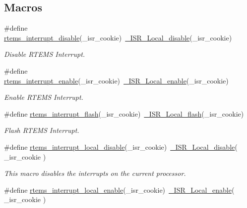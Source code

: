 \subsection*{Macros}
\begin{DoxyCompactItemize}
\item 
\#define \mbox{\hyperlink{group__ClassicINTR_gaf105388007be1416e810e1522cfe16e1}{rtems\+\_\+interrupt\+\_\+disable}}(\+\_\+isr\+\_\+cookie)~\mbox{\hyperlink{group__RTEMSScoreISR_ga2a829f51f98576aa596562985e1df2fc}{\+\_\+\+I\+S\+R\+\_\+\+Local\+\_\+disable}}(\+\_\+isr\+\_\+cookie)
\begin{DoxyCompactList}\small\item\em Disable R\+T\+E\+MS Interrupt. \end{DoxyCompactList}\item 
\#define \mbox{\hyperlink{group__ClassicINTR_gae4fb58b530af7eaba10c45b015282090}{rtems\+\_\+interrupt\+\_\+enable}}(\+\_\+isr\+\_\+cookie)~\mbox{\hyperlink{group__RTEMSScoreISR_ga508f5a32655cb590906a477b5a8174f1}{\+\_\+\+I\+S\+R\+\_\+\+Local\+\_\+enable}}(\+\_\+isr\+\_\+cookie)
\begin{DoxyCompactList}\small\item\em Enable R\+T\+E\+MS Interrupt. \end{DoxyCompactList}\item 
\#define \mbox{\hyperlink{group__ClassicINTR_ga994652cecbf5fc6e0bd8b9f5f2cb196d}{rtems\+\_\+interrupt\+\_\+flash}}(\+\_\+isr\+\_\+cookie)~\mbox{\hyperlink{group__RTEMSScoreISR_ga2ac9dcbae9ca059453a2042e5854f73f}{\+\_\+\+I\+S\+R\+\_\+\+Local\+\_\+flash}}(\+\_\+isr\+\_\+cookie)
\begin{DoxyCompactList}\small\item\em Flash R\+T\+E\+MS Interrupt. \end{DoxyCompactList}\item 
\#define \mbox{\hyperlink{group__ClassicINTR_ga691a9f609c9d6bf071d0966b8b715fab}{rtems\+\_\+interrupt\+\_\+local\+\_\+disable}}(\+\_\+isr\+\_\+cookie)~\mbox{\hyperlink{group__RTEMSScoreISR_ga2a829f51f98576aa596562985e1df2fc}{\+\_\+\+I\+S\+R\+\_\+\+Local\+\_\+disable}}( \+\_\+isr\+\_\+cookie )
\begin{DoxyCompactList}\small\item\em This macro disables the interrupts on the current processor. \end{DoxyCompactList}\item 
\#define \mbox{\hyperlink{group__ClassicINTR_gabd2556ab8902ebb660b470e144bdc55a}{rtems\+\_\+interrupt\+\_\+local\+\_\+enable}}(\+\_\+isr\+\_\+cookie)~\mbox{\hyperlink{group__RTEMSScoreISR_ga508f5a32655cb590906a477b5a8174f1}{\+\_\+\+I\+S\+R\+\_\+\+Local\+\_\+enable}}( \+\_\+isr\+\_\+cookie )

\end{DoxyCompactItemize}
